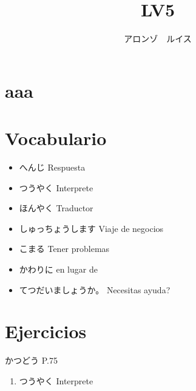 \documentclass[a4paper,lualatex,ja=standard,base=10pt]{bxjsarticle}
\title{\ruby{第|１２|課}{だい||か} LV5}
\author{アロンゾ　ルイス}
\begin{document}
\setcounter{page}{1}

\maketitle{}
\thispagestyle{fancy}

\section{aaa}

\section{Vocabulario}

\begin{itemize}
  \item へんじ Respuesta
  \item つうやく Interprete
  \item ほんやく Traductor
  \item しゅっちょうします Viaje de negocios
  \item こまる Tener problemas
  \item かわりに en lugar de
  \item てつだいましょうか。 Necesitas ayuda?
\end{itemize}

\section{Ejercicios}

かつどう P.75

\begin{enumerate}
  \item つうやく Interprete
\end{enumerate}
\end{document}
